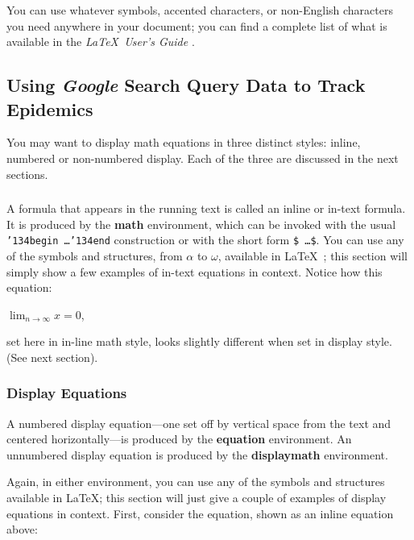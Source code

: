 \documentclass[sigconf]{acmart}
\begin{document}
You can use whatever symbols, accented characters, or non-English
characters you need anywhere in your document; you can find a complete
list of what is available in the \textit{\LaTeX\ User's Guide}
\cite{Lamport:LaTeX}.

\subsection{Using {\itshape Google} Search Query Data to Track Epidemics}

You may want to display math equations in three distinct styles:
inline, numbered or non-numbered display.  Each of
the three are discussed in the next sections.

\subsubsection{}

A formula that appears in the running text is called an
inline or in-text formula.  It is produced by the
\textbf{math} environment, which can be
invoked with the usual \texttt{{\char'134}begin\,\ldots{\char'134}end}
construction or with the short form \texttt{\$\,\ldots\$}. You
can use any of the symbols and structures,
from $\alpha$ to $\omega$, available in
\LaTeX~\cite{Lamport:LaTeX}; this section will simply show a
few examples of in-text equations in context. Notice how
this equation:

\begin{math}
  \lim_{n\rightarrow \infty}x=0
\end{math},

set here in in-line math style, looks slightly different when
set in display style.  (See next section).

\subsubsection{Display Equations}

A numbered display equation---one set off by vertical space from the
text and centered horizontally---is produced by the \textbf{equation}
environment. An unnumbered display equation is produced by the
\textbf{displaymath} environment.

Again, in either environment, you can use any of the symbols
and structures available in \LaTeX\@; this section will just
give a couple of examples of display equations in context.
First, consider the equation, shown as an inline equation above:
\end{document}

